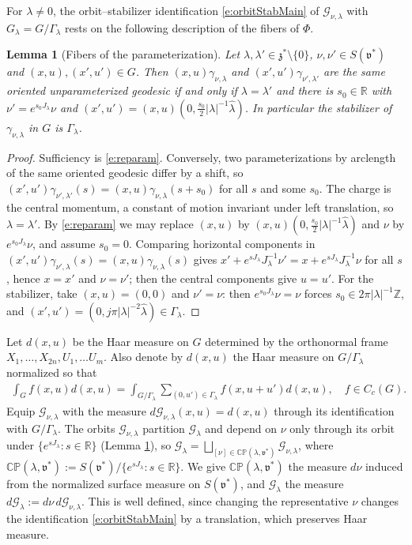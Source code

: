 \documentclass[11pt]{amsart}
\theoremstyle{plain}
\newtheorem{lemma}[theorem]{Lemma}
\theoremstyle{definition}
\theoremstyle{remark}
\numberwithin{equation}{section}
\def\fz{\mathfrak{z}}
\def\fv{\mathfrak{v}}
\def\cG{\mathcal{G}}
\def\CP{\mathbb{CP}}
\def\mz{\setminus\{0\}}
\def\R{{\mathbb R}}%
\def\Z{{\mathbb Z}}%
\numberwithin{equation}{section}
\begin{document}
For $\lambda\neq0$, the orbit--stabilizer identification \eqref{e:orbitStabMain} of $\cG_{\nu, \lambda}$ with $G_\lambda=G/\Gamma_\lambda$ rests on the following description of the fibers of $\Phi$.
\begin{lemma}[Fibers of the parameterization]\label{l:fibers}
	Let $\lambda, \lambda'\in \fz^*\mz$, $\nu, \nu'\in S(\fv^*)$ and $(x, u), (x', u')\in G$. Then $(x, u)\gamma_{\nu, \lambda}$ and $(x', u')\gamma_{\nu', \lambda'}$ are the same oriented unparameterized geodesic if and only if $\lambda=\lambda'$ and there is $s_0\in \R$ with $\nu'=e^{s_0J_\lambda}\nu$ and $(x', u')=(x, u)(0, \tfrac{s_0}{2}|\lambda|^{-1}\hat\lambda)$. In particular the stabilizer of $\gamma_{\nu, \lambda}$ in $G$ is $\Gamma_\lambda$.
\end{lemma}
\begin{proof}
	Sufficiency is \eqref{e:reparam}. Conversely, two parameterizations by arclength of the same oriented geodesic differ by a shift, so $(x', u')\gamma_{\nu', \lambda'}(s)=(x, u)\gamma_{\nu, \lambda}(s+s_0)$ for all $s$ and some $s_0$. The charge is the central momentum, a constant of motion invariant under left translation, so $\lambda=\lambda'$. By \eqref{e:reparam} we may replace $(x, u)$ by $(x, u)(0, \tfrac{s_0}{2}|\lambda|^{-1}\hat\lambda)$ and $\nu$ by $e^{s_0J_\lambda}\nu$, and assume $s_0=0$. Comparing horizontal components in $(x', u')\gamma_{\nu', \lambda}(s)=(x, u)\gamma_{\nu, \lambda}(s)$ gives $x'+e^{sJ_\lambda}J_\lambda^{-1}\nu'=x+e^{sJ_\lambda}J_\lambda^{-1}\nu$ for all $s$, hence $x=x'$ and $\nu=\nu'$; then the central components give $u=u'$. For the stabilizer, take $(x, u)=(0, 0)$ and $\nu'=\nu$: then $e^{s_0J_\lambda}\nu=\nu$ forces $s_0\in 2\pi|\lambda|^{-1}\Z$, and $(x', u')=(0, j\pi|\lambda|^{-2}\hat\lambda)\in \Gamma_\lambda$.
\end{proof}
Let $d(x, u)$ be the Haar measure on $G$ determined by the orthonormal frame $X_1, \ldots, X_{2n}, U_1, \ldots U_m$. Also denote by $d(x, u)$ the Haar measure on $G/\Gamma_\lambda$ normalized so that 
\begin{align}\label{Haar2}
	\int_Gf(x, u)d(x, u)=\int_{G/\Gamma_\lambda}\sum_{(0, u')\in \Gamma_\lambda}f(x, u+u')d(x, u), \quad f\in C_c(G).
\end{align}
Equip $\cG_{\nu, \lambda}$ with the measure $d\cG_{\nu, \lambda}(x, u)=d(x, u)$ through its identification with $G/\Gamma_\lambda$. The orbits $\cG_{\nu, \lambda}$ partition $\cG_\lambda$ and depend on $\nu$ only through its orbit under $\{e^{sJ_\lambda}: s\in \R\}$ (Lemma \ref{l:fibers}), so $\cG_\lambda=\bigsqcup_{[\nu]\in \CP(\lambda, \fv^*)}\cG_{\nu, \lambda}$, where $\CP(\lambda, \fv^*):=S(\fv^*)/\{e^{sJ_\lambda}: s\in \R\}$. We give $\CP(\lambda, \fv^*)$ the measure $d\nu$ induced from the normalized surface measure on $S(\fv^*)$, and $\cG_\lambda$ the measure $d\cG_\lambda:=d\nu\, d\cG_{\nu, \lambda}$. This is well defined, since changing the representative $\nu$ changes the identification \eqref{e:orbitStabMain} by a translation, which preserves Haar measure. 
\end{document}
